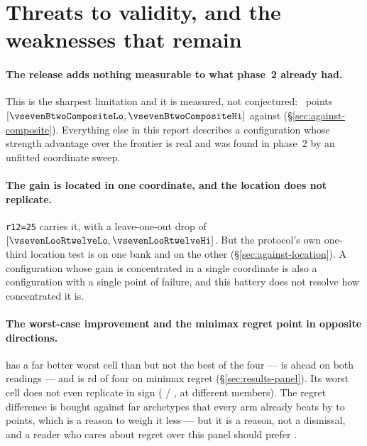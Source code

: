 \section{Threats to validity, and the weaknesses that remain}
\label{sec:limitations}

\paragraph{The release adds nothing measurable to what phase~2 already had.}
This is the sharpest limitation and it is measured, not conjectured:
\vsevenBtwoComposite{}~points $[\vsevenBtwoCompositeLo, \vsevenBtwoCompositeHi]$ against \composite{}
(\S\ref{sec:against-composite}). Everything else in this report describes a configuration whose strength
advantage over the \vsix{} frontier is real and was found in phase~2 by an unfitted coordinate sweep.

\paragraph{The gain is located in one coordinate, and the location does not replicate.}
\texttt{r12=25} carries it, with a leave-one-out drop of \vsevenLooRtwelve{}
$[\vsevenLooRtwelveLo, \vsevenLooRtwelveHi]$. But the protocol's own one-third location test is
\vsevenLocVerdictOne{} on one bank and \vsevenLocVerdictThree{} on the other
(\S\ref{sec:against-location}). A configuration whose gain is concentrated in a single coordinate is
also a configuration with a single point of failure, and this battery does not resolve how concentrated
it is.

\paragraph{The worst-case improvement and the minimax regret point in opposite directions.}
\frozen{} has a far better worst cell than \incumbent{} but not the best of the four ---
\composite{} is ahead on both readings --- and \frozen{} is \vsevenRegretFrozenRank{}rd of four on
minimax regret (\S\ref{sec:results-panel}). Its worst cell does not even replicate in sign
(\vsevenWorstFrozenBankOne{} / \vsevenWorstFrozenBankTwo{}, at different members). The regret difference is bought against far archetypes that
every arm already beats by \vsevenFarSpanLo{} to \vsevenFarSpanHi{} points, which is a reason to
weigh it less --- but it
is a reason, not a dismissal, and a reader who cares about regret over this panel should prefer
\fcheap{}.

